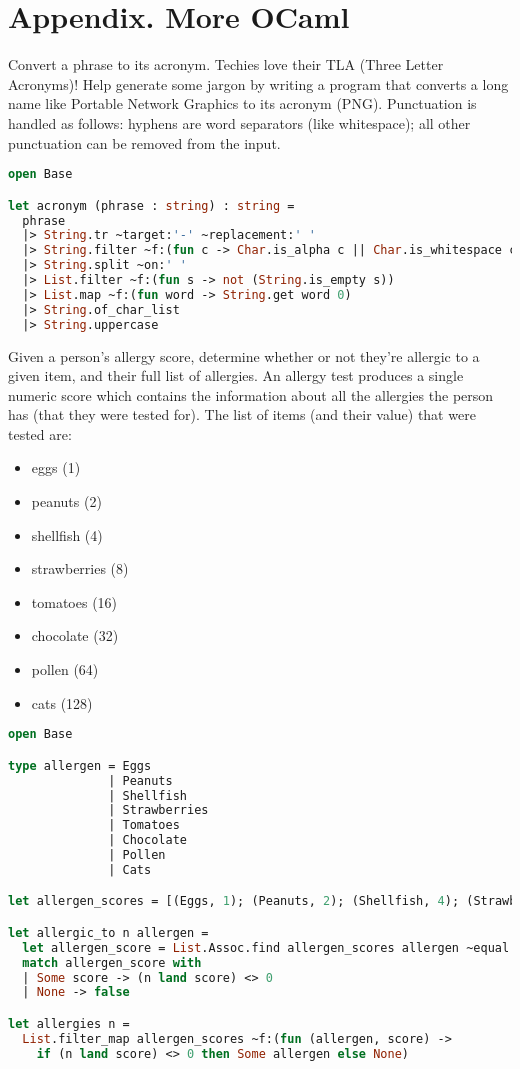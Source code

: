 \section*{Appendix. More OCaml}

\problem[Acronym]
Convert a phrase to its acronym.
Techies love their TLA (Three Letter Acronyms)!
Help generate some jargon by writing a program that converts a long name like Portable Network Graphics to its acronym (PNG).
Punctuation is handled as follows: hyphens are word separators (like whitespace); all other punctuation can be removed from the input.

\begin{lstlisting}[language=OCaml]
open Base

let acronym (phrase : string) : string =
  phrase
  |> String.tr ~target:'-' ~replacement:' '
  |> String.filter ~f:(fun c -> Char.is_alpha c || Char.is_whitespace c)
  |> String.split ~on:' '
  |> List.filter ~f:(fun s -> not (String.is_empty s))
  |> List.map ~f:(fun word -> String.get word 0)
  |> String.of_char_list
  |> String.uppercase
\end{lstlisting}

\problem[Allergies]
Given a person's allergy score, determine whether or not they're allergic to a given item, and their full list of allergies.
An allergy test produces a single numeric score which contains the information about all the allergies the person has (that they were tested for).
The list of items (and their value) that were tested are:

\begin{itemize}
  \item eggs (1)
  \item peanuts (2)
  \item shellfish (4)
  \item strawberries (8)
  \item tomatoes (16)
  \item chocolate (32)
  \item pollen (64)
  \item cats (128)
\end{itemize}

\begin{lstlisting}[language=OCaml]
open Base

type allergen = Eggs
              | Peanuts
              | Shellfish
              | Strawberries
              | Tomatoes
              | Chocolate
              | Pollen
              | Cats

let allergen_scores = [(Eggs, 1); (Peanuts, 2); (Shellfish, 4); (Strawberries, 8); (Tomatoes, 16); (Chocolate, 32); (Pollen, 64); (Cats, 128)]

let allergic_to n allergen =
  let allergen_score = List.Assoc.find allergen_scores allergen ~equal:Poly.equal in
  match allergen_score with
  | Some score -> (n land score) <> 0
  | None -> false

let allergies n =
  List.filter_map allergen_scores ~f:(fun (allergen, score) ->
    if (n land score) <> 0 then Some allergen else None)
\end{lstlisting}

